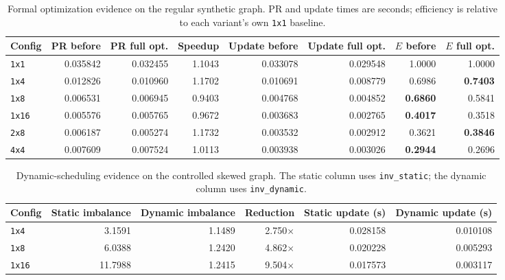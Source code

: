 \documentclass[11pt]{article}
\begin{document}
\begin{table}[H]
\centering
\caption{Formal optimization evidence on the regular synthetic graph. PR and
update times are seconds; efficiency is relative to each variant's own
\texttt{1x1} baseline.}
\label{tab:wang-optimization-ablation}
\scriptsize
\begin{tabular}{lrrrrrrr}
\toprule
Config & PR before & PR full opt. & Speedup & Update before & Update full opt. & $E$ before & $E$ full opt. \\
\midrule
\texttt{1x1}  & 0.035842 & 0.032455 & 1.1043 & 0.033078 & 0.029548 & 1.0000 & 1.0000 \\
\texttt{1x4}  & 0.012826 & 0.010960 & 1.1702 & 0.010691 & 0.008779 & 0.6986 & \textbf{0.7403} \\
\texttt{1x8}  & 0.006531 & 0.006945 & 0.9403 & 0.004768 & 0.004852 & \textbf{0.6860} & 0.5841 \\
\texttt{1x16} & 0.005576 & 0.005765 & 0.9672 & 0.003683 & 0.002765 & \textbf{0.4017} & 0.3518 \\
\texttt{2x8}  & 0.006187 & 0.005274 & 1.1732 & 0.003532 & 0.002912 & 0.3621 & \textbf{0.3846} \\
\texttt{4x4}  & 0.007609 & 0.007524 & 1.0113 & 0.003938 & 0.003026 & \textbf{0.2944} & 0.2696 \\
\bottomrule
\end{tabular}
\end{table}

\begin{table}[H]
\centering
\caption{Dynamic-scheduling evidence on the controlled skewed graph. The
static column uses \texttt{inv\_static}; the dynamic column uses
\texttt{inv\_dynamic}.}
\label{tab:wang-optimization-skewed}
\small
\begin{tabular}{lrrrrr}
\toprule
Config & Static imbalance & Dynamic imbalance & Reduction & Static update (s) & Dynamic update (s) \\
\midrule
\texttt{1x4}  & 3.1591  & 1.1489 & 2.750$\times$ & 0.028158 & 0.010108 \\
\texttt{1x8}  & 6.0388  & 1.2420 & 4.862$\times$ & 0.020228 & 0.005293 \\
\texttt{1x16} & 11.7988 & 1.2415 & 9.504$\times$ & 0.017573 & 0.003117 \\
\bottomrule
\end{tabular}
\end{table}
\end{document}
